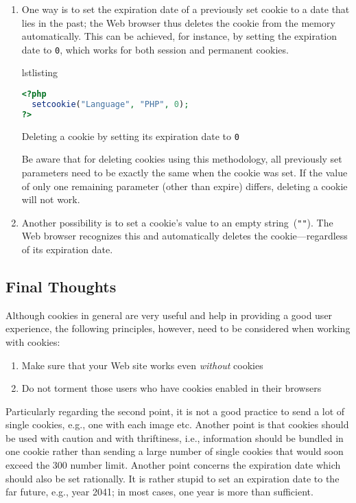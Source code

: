 \documentclass[a4paper, justified, notoc]{tufte-handout} %
\makeatletter
\newenvironment{listing}[1][htbp]
  {\ifvmode\else\unskip\fi\begin{@tufte@float}[#1]{lstlisting}{}}
  {\end{@tufte@float} } %
\makeatother
\begin{document}
\begin{enumerate}
	\item One way is to set the expiration date of a previously set cookie to a date that lies in the past; the Web browser thus deletes the cookie from the memory automatically. This can be achieved, for instance, by setting the expiration date to \texttt{0}, which works for both session and permanent cookies.
\begin{listing}
\begin{lstlisting}[language=PHP]
<?php
  setcookie("Language", "PHP", 0);
?>
\end{lstlisting}
	\caption{Deleting a cookie by setting its expiration date to \texttt{0}}
	\label{setting_cookies}
\end{listing}

Be aware that for deleting cookies using this methodology, all previously set parameters need to be exactly the same when the cookie was set. If the value of only one remaining parameter (other than expire) differs, deleting a cookie will not work.

	\item Another possibility is to set a cookie's value to an empty string~(\texttt{""}). The Web browser recognizes this and automatically deletes the cookie---regardless of its expiration date.
\end{enumerate}

\subsection{Final Thoughts} %
\label{sub:final_thoughts}
Although cookies in general are very useful and help in providing a good user experience, the following principles, however, need to be considered when working with cookies:
\begin{enumerate}
	\item Make sure that your Web site works even \emph{without} cookies
	\item Do not torment those users who have cookies enabled in their browsers 
\end{enumerate}

Particularly regarding the second point, it is not a good practice to send a lot of single cookies, e.g., one with each image etc. Another point is that cookies should be used with caution and with thriftiness, i.e., information should be bundled in one cookie rather than sending a large number of single cookies that would soon exceed the 300 number limit. 
Another point concerns the expiration date which should also be set rationally. It is rather stupid to set an expiration date to the far future, e.g., year 2041; in most cases, one year is more than sufficient.
\end{document}

